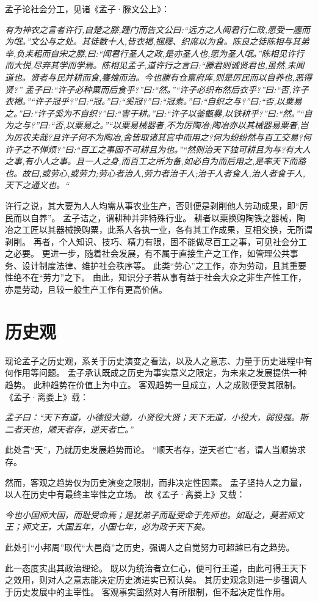 \documentclass[11pt]{article}
\begin{document}
孟子论社会分工，见诸《孟子·滕文公上》：

\textit{有为神农之言者许行,自楚之滕,踵门而告文公曰:“远方之人闻君行仁政,愿受一廛而为氓。”文公与之处。其徒数十人,皆衣褐,捆屦、织席以为食。陈良之徒陈相与其弟辛,负耒耜而自宋之滕,曰:“闻君行圣人之政,是亦圣人也,愿为圣人氓。”陈相见许行而大悦,尽弃其学而学焉。陈相见孟子,道许行之言曰:“滕君则诚贤君也,虽然,未闻道也。贤者与民并耕而食,饔飧而治。今也滕有仓禀府库,则是厉民而以自养也,恶得贤?”
孟子曰:“许子必种粟而后食乎?”曰:“然。”“许子必织布然后衣乎?”曰:“否,许子衣褐。”“许子冠乎?”曰:“冠。”曰:“奚冠?”曰:“冠素。”曰:“自织之与?”曰:“否,以粟易之。”曰:“许子奚为不自织?”曰:“害于耕。”曰:“许子以釜甑爨,以铁耕乎?”曰:“然。”“自为之与?”曰:“否,以粟易之。”“以粟易械器者,不为厉陶冶;陶冶亦以其械器易粟者,岂为厉农夫哉?且许子何不为陶冶,舍皆取诸其宫中而用之?何为纷纷然与百工交易?何许子之不惮烦?”曰:“百工之事固不可耕且为也。”“然则治天下独可耕且为与?有大人之事,有小人之事。且一人之身,而百工之所为备,如必自为而后用之,是率天下而路也。故曰,或劳心,或劳力;劳心者治人,劳力者治于人;治于人者食人,治人者食于人,天下之通义也。“}

许行之说，其大要为人人均需从事农业生产，否则便是剥削他人劳动成果，即“厉民而以自养”。
孟子诘之，谓耕种并非特殊行业。
耕者以粟换购陶铁之器械，陶冶之工匠以其器械换购粟，此系人各执一业，各有其工作成果，互相交换，无所谓剥削。
再者，个人知识、技巧、精力有限，固不能做尽百工之事，可见社会分工之必要。
更进一步，随着社会发展，有不属于直接生产之工作，如管理公共事务、设计制度法律、维护社会秩序等。
此类“劳心”之工作，亦为劳动，且其重要性绝不在“劳力”之下。
由此，知识分子若从事有益于社会大众之非生产性工作，亦是劳动，且较一般生产工作有更高价值。
  
\section{历史观}
现论孟子之历史观，系关于历史演变之看法，以及人之意志、力量于历史进程中有何作用等问题。
孟子承认既成之历史为事实意义之限定，为未来之发展提供一种趋势。
此种趋势在价值上为中立。
客观趋势一旦成立，人之成败便受其限制。
《孟子·离娄上》载：

\textit{孟子曰：“天下有道，小德役大德，小贤役大贤；天下无道，小役大，弱役强。斯二者天也，顺天者存，逆天者亡。”}

此处言“天”，乃就历史发展趋势而论。
“顺天者存，逆天者亡”者，谓人当顺势求存。

\newline

然而，客观之趋势仅为历史演变之限制，而非决定性因素。
孟子坚持人之力量，以人在历史中有最终主宰性之立场。
故《孟子·离娄上》又载：

\textit{今也小国师大国，而耻受命焉；是犹弟子而耻受命于先师也。如耻之，莫若师文王；师文王，大国五年，小国七年，必为政于天下矣。}

此处引“小邦周”取代“大邑商”之历史，强调人之自觉努力可超越已有之趋势。

此一态度实出其政治理论。
既以为统治者立仁心，便可行王道，由此可得王天下之效用，则对人之意志能决定历史演进实已预认矣。
其历史观念则进一步强调人于历史发展中的主宰性。
客观事实固然对人有所限制，但不起决定性作用。
\end{document}
